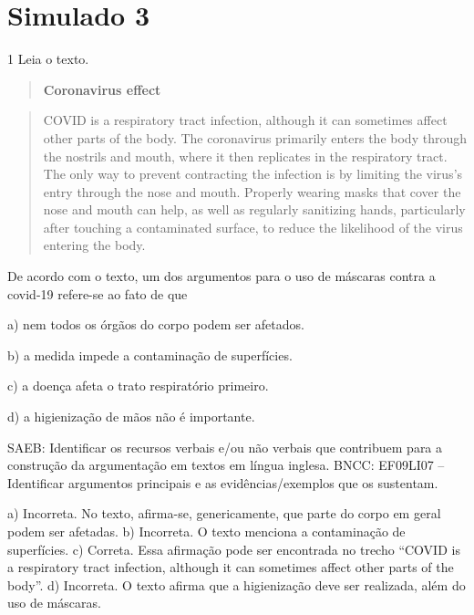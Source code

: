

\section{Simulado 3}\label{simulado-3}

\num{1} Leia o texto.

\begin{quote}
\textbf{Coronavirus effect}
\end{quote}

\begin{quote}
COVID is a respiratory tract infection, although it can sometimes affect
other parts of the body. The coronavirus primarily enters the body
through the nostrils and mouth, where it then replicates in the
respiratory tract. The only way to prevent contracting the infection is
by limiting the virus's entry through the nose and mouth. Properly
wearing masks that cover the nose and mouth can help, as well as
regularly sanitizing hands, particularly after touching a contaminated
surface, to reduce the likelihood of the virus entering the body.
\end{quote}


De acordo com o texto, um dos argumentos para o uso de máscaras contra a
covid-19 refere-se ao fato de que

a) nem todos os órgãos do corpo podem ser afetados.

b) a medida impede a contaminação de superfícies.

c) a doença afeta o trato respiratório primeiro.

d) a higienização de mãos não é importante.

SAEB: Identificar os recursos verbais e/ou não verbais que contribuem
para a construção da argumentação em textos em língua inglesa. BNCC:
EF09LI07 -- Identificar argumentos principais e as evidências/exemplos
que os sustentam.

a) Incorreta. No texto, afirma-se, genericamente, que parte do corpo em
geral podem ser afetadas. b) Incorreta. O texto menciona a contaminação
de superfícies. c) Correta. Essa afirmação pode ser encontrada no trecho
``COVID is a respiratory tract infection, although it can sometimes
affect other parts of the body''. d) Incorreta. O texto afirma que a
higienização deve ser realizada, além do uso de máscaras.

